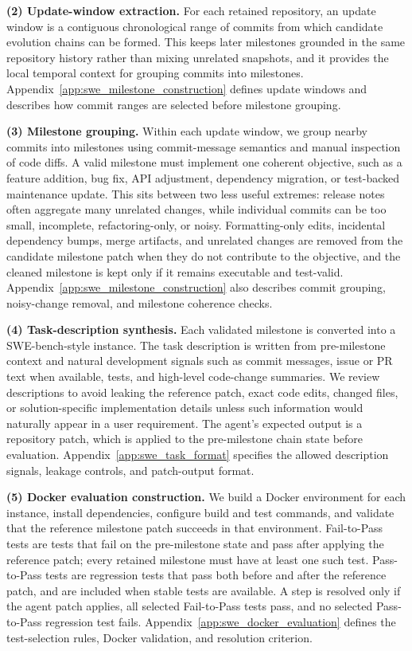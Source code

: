 \documentclass{llmxive}
\begin{document}
\textbf{(2) Update-window extraction.} \noindent
For each retained repository, an update window is a contiguous chronological range of commits from which candidate evolution chains can be formed. This keeps later milestones grounded in the same repository history rather than mixing unrelated snapshots, and it provides the local temporal context for grouping commits into milestones. Appendix~\ref{app:swe_milestone_construction} defines update windows and describes how commit ranges are selected before milestone grouping.

\textbf{(3) Milestone grouping.} \noindent
Within each update window, we group nearby commits into milestones using commit-message semantics and manual inspection of code diffs. A valid milestone must implement one coherent objective, such as a feature addition, bug fix, API adjustment, dependency migration, or test-backed maintenance update. This sits between two less useful extremes: release notes often aggregate many unrelated changes, while individual commits can be too small, incomplete, refactoring-only, or noisy. Formatting-only edits, incidental dependency bumps, merge artifacts, and unrelated changes are removed from the candidate milestone patch when they do not contribute to the objective, and the cleaned milestone is kept only if it remains executable and test-valid. Appendix~\ref{app:swe_milestone_construction} also describes commit grouping, noisy-change removal, and milestone coherence checks.

\textbf{(4) Task-description synthesis.} \noindent
Each validated milestone is converted into a SWE-bench-style instance. The task description is written from pre-milestone context and natural development signals such as commit messages, issue or PR text when available, tests, and high-level code-change summaries. We review descriptions to avoid leaking the reference patch, exact code edits, changed files, or solution-specific implementation details unless such information would naturally appear in a user requirement. The agent's expected output is a repository patch, which is applied to the pre-milestone chain state before evaluation. Appendix~\ref{app:swe_task_format} specifies the allowed description signals, leakage controls, and patch-output format.

\textbf{(5) Docker evaluation construction.} \noindent
We build a Docker environment for each instance, install dependencies, configure build and test commands, and validate that the reference milestone patch succeeds in that environment. Fail-to-Pass tests are tests that fail on the pre-milestone state and pass after applying the reference patch; every retained milestone must have at least one such test. Pass-to-Pass tests are regression tests that pass both before and after the reference patch, and are included when stable tests are available. A step is resolved only if the agent patch applies, all selected Fail-to-Pass tests pass, and no selected Pass-to-Pass regression test fails. Appendix~\ref{app:swe_docker_evaluation} defines the test-selection rules, Docker validation, and resolution criterion.
\end{document}
